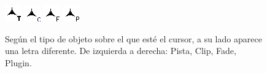 \begin{figure}[htb]
 \centering
 \includegraphics[height=2\baselineskip]{../images/cursorFloatOverTrack.png}\qquad
 \includegraphics[height=2\baselineskip]{../images/cursorFloatOverClip.png}\qquad
 \includegraphics[height=2\baselineskip]{../images/cursorFloatOverFade.png}\qquad
 \includegraphics[height=2\baselineskip]{../images/cursorFloatOverPlugin.png}
 \caption{Según el tipo de objeto sobre el que esté el cursor, a su lado aparece una letra diferente. De izquierda a derecha: Pista, Clip, Fade, Plugin.}
 \label{fig_cursor}
\end{figure}

